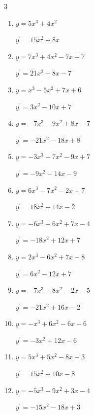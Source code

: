 \begin{multicols}{3}
\begin{enumerate}
        $\displaystyle y^{\prime}=3x^{2}+8x+1$

  \item $y=5x^{3}+4x^{2}$

        $\displaystyle y^{\prime}=15x^{2}+8x$

  \item $y=7x^{3}+4x^{2}-7x+7$

        $\displaystyle y^{\prime}=21x^{2}+8x-7$

  \item $y=x^{3}-5x^{2}+7x+6$

        $\displaystyle y^{\prime}=3x^{2}-10x+7$

  \item $y=-7x^{3}-9x^{2}+8x-7$

        $\displaystyle y^{\prime}=-21x^{2}-18x+8$

  \item $y=-3x^{3}-7x^{2}-9x+7$

        $\displaystyle y^{\prime}=-9x^{2}-14x-9$

\columnbreak %

\resetques

  \item $y=6x^{3}-7x^{2}-2x+7$

        $\displaystyle y^{\prime}=18x^{2}-14x-2$

  \item $y=-6x^{3}+6x^{2}+7x-4$

        $\displaystyle y^{\prime}=-18x^{2}+12x+7$

  \item $y=2x^{3}-6x^{2}+7x-8$

        $\displaystyle y^{\prime}=6x^{2}-12x+7$

  \item $y=-7x^{3}+8x^{2}-2x-5$

        $\displaystyle y^{\prime}=-21x^{2}+16x-2$

  \item $y=-x^{3}+6x^{2}-6x-6$

        $\displaystyle y^{\prime}=-3x^{2}+12x-6$

  \item $y=5x^{3}+5x^{2}-8x-3$

        $\displaystyle y^{\prime}=15x^{2}+10x-8$

  \item $y=-5x^{3}-9x^{2}+3x-4$

        $\displaystyle y^{\prime}=-15x^{2}-18x+3$


\end{enumerate}
\end{multicols}
